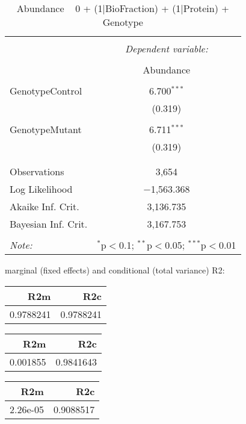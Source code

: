 \documentclass[11pt]{report}
\begin{document}
\begin{table}[!htbp] \centering 
  \caption{Abundance ~ 0 + (1|BioFraction) + (1|Protein) + Genotype} 
  \label{} 
\begin{tabular}{@{\extracolsep{5pt}}lc} 
\\[-1.8ex]\hline 
\hline \\[-1.8ex] 
 & \multicolumn{1}{c}{\textit{Dependent variable:}} \\ 
\cline{2-2} 
\\[-1.8ex] & Abundance \\ 
\hline \\[-1.8ex] 
 GenotypeControl & 6.700$^{***}$ \\ 
  & (0.319) \\ 
  & \\ 
 GenotypeMutant & 6.711$^{***}$ \\ 
  & (0.319) \\ 
  & \\ 
\hline \\[-1.8ex] 
Observations & 3,654 \\ 
Log Likelihood & $-$1,563.368 \\ 
Akaike Inf. Crit. & 3,136.735 \\ 
Bayesian Inf. Crit. & 3,167.753 \\ 
\hline 
\hline \\[-1.8ex] 
\textit{Note:}  & \multicolumn{1}{r}{$^{*}$p$<$0.1; $^{**}$p$<$0.05; $^{***}$p$<$0.01} \\ 
\end{tabular} 
\end{table} 
marginal (fixed effects) and conditional (total variance) R2:

\begin{tabular}{r|r}
\hline
R2m & R2c\\
\hline
0.9788241 & 0.9788241\\
\hline
\end{tabular}

\begin{tabular}{r|r}
\hline
R2m & R2c\\
\hline
0.001855 & 0.9841643\\
\hline
\end{tabular}

\begin{tabular}{r|r}
\hline
R2m & R2c\\
\hline
2.26e-05 & 0.9088517\\
\hline
\end{tabular}
\end{document}
